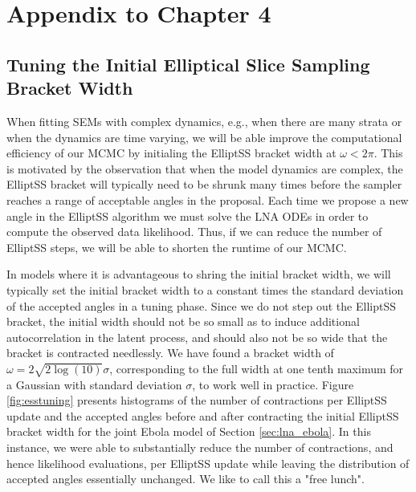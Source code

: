 \chapter{Appendix to Chapter 4}
\label{chap:appendix_ch4}

\section{Tuning the Initial Elliptical Slice Sampling Bracket Width}
\label{sec:lna_init_bracket_width}

When fitting SEMs with complex dynamics, e.g., when there are many strata or when the dynamics are time varying, we will be able improve the computational efficiency of our MCMC by initialing the ElliptSS bracket width at $ \omega < 2\pi $. This is motivated by the observation that when the model dynamics are complex, the ElliptSS bracket will typically need to be shrunk many times before the sampler reaches a range of acceptable angles in the proposal. Each time we propose a new angle in the ElliptSS algorithm we must solve the LNA ODEs in order to compute the observed data likelihood. Thus, if we can reduce the number of ElliptSS steps, we will be able to shorten the runtime of our MCMC. 

In models where it is advantageous to shring the initial bracket width, we will typically set the initial bracket width to a constant times the standard deviation of the accepted angles in a tuning phase. Since we do not step out the ElliptSS bracket, the initial width should not be so small as to induce additional autocorrelation in the latent process, and should also not be so wide that the bracket is contracted needlessly. We have found a bracket width of $ \omega = 2\sqrt{2\log(10)}\sigma $, corresponding to the full width at one tenth maximum for a Gaussian with standard deviation $ \sigma $, to work well in practice. Figure \ref{fig:esstuning} presents histograms of the number of contractions per ElliptSS update and the accepted angles before and after contracting the initial ElliptSS bracket width for the joint Ebola model of Section \ref{sec:lna_ebola}. In this instance, we were able to substantially reduce the number of contractions, and hence likelihood evaluations, per ElliptSS update while leaving the distribution of accepted angles essentially unchanged. We like to call this a "free lunch".

